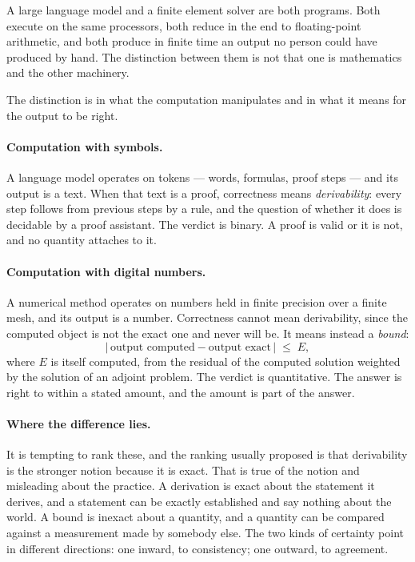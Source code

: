 \documentclass[11pt]{article}
\begin{document}
A large language model and a finite element solver are both programs. Both execute on the same
processors, both reduce in the end to floating-point arithmetic, and both produce in finite time an
output no person could have produced by hand. The distinction between them is not that one is
mathematics and the other machinery.

The distinction is in what the computation manipulates and in what it means for the output to be
right.

\paragraph{Computation with symbols.} A language model operates on tokens --- words, formulas, proof
steps --- and its output is a text. When that text is a proof, correctness means \emph{derivability}:
every step follows from previous steps by a rule, and the question of whether it does is decidable
by a proof assistant. The verdict is binary. A proof is valid or it is not, and no quantity attaches
to it.

\paragraph{Computation with digital numbers.} A numerical method operates on numbers held in finite
precision over a finite mesh, and its output is a number. Correctness cannot mean derivability, since
the computed object is not the exact one and never will be. It means instead a \emph{bound}:
\[
|\,\text{output computed} - \text{output exact}\,| \;\le\; E ,
\]
where $E$ is itself computed, from the residual of the computed solution weighted by the solution of
an adjoint problem. The verdict is quantitative. The answer is right to within a stated amount, and
the amount is part of the answer.

\paragraph{Where the difference lies.} It is tempting to rank these, and the ranking usually proposed
is that derivability is the stronger notion because it is exact. That is true of the notion and
misleading about the practice. A derivation is exact about the statement it derives, and a statement
can be exactly established and say nothing about the world. A bound is inexact about a quantity, and
a quantity can be compared against a measurement made by somebody else. The two kinds of certainty
point in different directions: one inward, to consistency; one outward, to agreement.
\end{document}

